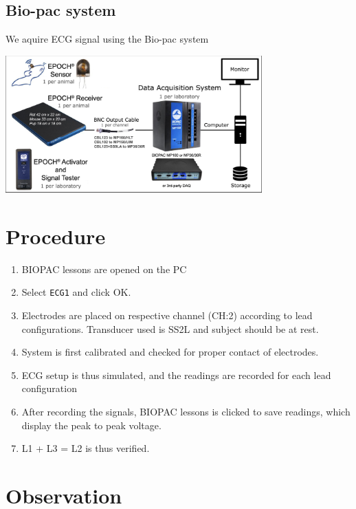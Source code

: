 \documentclass[
  11pt,
  letterpaper,
  DIV=11,
  numbers=noendperiod]{scrreprt}
\providecommand{\tightlist}{%
  \setlength{\itemsep}{0pt}\setlength{\parskip}{0pt}}\usepackage{longtable,booktabs,array}
\begin{document}
\subsection{Bio-pac system}\label{bio-pac-system}

We aquire ECG signal using the Bio-pac system

\begin{center}
\includegraphics[width=0.74\textwidth,height=\textheight]{images/clipboard-1355974490.png}
\end{center}

\section{Procedure}\label{procedure-1}

\begin{enumerate}
\def\labelenumi{\arabic{enumi}.}
\tightlist
\item
  BIOPAC lessons are opened on the PC
\item
  Select \texttt{ECG1} and click OK.
\item
  Electrodes are placed on respective channel (CH:2) according to lead
  configurations. Transducer used is SS2L and subject should be at rest.
\item
  System is first calibrated and checked for proper contact of
  electrodes.
\item
  ECG setup is thus simulated, and the readings are recorded for each
  lead configuration
\item
  After recording the signals, BIOPAC lessons is clicked to save
  readings, which display the peak to peak voltage.
\item
  L1 + L3 = L2 is thus verified.
\end{enumerate}

\section{Observation}\label{observation-1}
\end{document}
